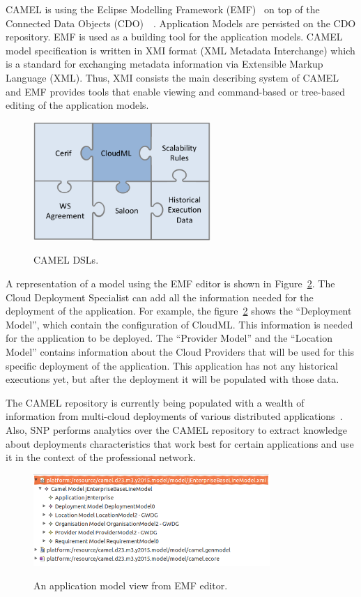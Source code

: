 CAMEL is using the Eclipse Modelling Framework (EMF)~\cite{steinberg2008emf} on top of the Connected Data Objects (CDO)~\cite{cdomodel}~\cite{paasage-d4.1.1}. Application Models are persisted on the CDO repository. EMF is used as a building tool for the application models. CAMEL model specification is written in XMI format (XML Metadata Interchange) which is a standard for exchanging metadata information via Extensible Markup Language (XML). Thus, XMI consists the main describing system of CAMEL and EMF provides tools that enable viewing and command-based or tree-based editing of the application models. 

\begin{figure}[h]
	\caption{CAMEL DSLs.}
	\includegraphics[width=0.6\textwidth,natwidth=200,natheight=150]{./fig/dsl.png}
	\centering
	\label{fig:dsls}
\end{figure}

A representation of a model using the EMF editor is shown in Figure~\ref{fig:app_view_emf}. The Cloud Deployment Specialist can add all the information needed for the deployment of the application. For example, the figure~\ref{fig:app_view_emf} shows the ``Deployment Model'', which contain the configuration of CloudML. This information is needed for the application to be deployed. The ``Provider Model'' and the ``Location Model'' contains information about the Cloud Providers that will be used for this specific deployment of the application. This application has not any historical executions yet, but after the deployment it will be populated with those data.
 
The CAMEL repository is currently being populated with a wealth of information from multi-cloud deployments of various distributed applications~\cite{Papaioannou2013}. Also, SNP performs analytics over the CAMEL repository to extract knowledge about deployments characteristics that work best for certain applications and use it in the context of the professional network.

\begin{figure}[h]
	\caption{An application model view from EMF editor.}
	\includegraphics[width=0.8\textwidth,natwidth=200,natheight=150]{./fig/camel_model_example.png}
	\centering
	\label{fig:app_view_emf}
\end{figure}

